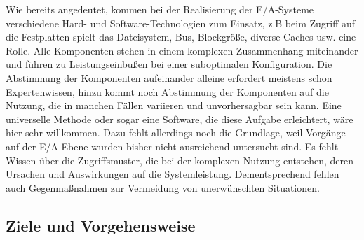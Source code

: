 Wie bereits angedeutet, kommen bei der Realisierung der E/A-Systeme verschiedene Hard- und Software-Technologien zum Einsatz, z.B beim Zugriff auf die Festplatten spielt das Dateisystem, Bus, Blockgröße, diverse Caches usw. eine Rolle. Alle Komponenten stehen in einem komplexen Zusammenhang miteinander und führen zu Leistungseinbußen bei einer suboptimalen Konfiguration. Die Abstimmung der Komponenten aufeinander alleine erfordert meistens schon Expertenwissen, hinzu kommt noch Abstimmung der Komponenten auf die Nutzung, die in manchen Fällen variieren und unvorhersagbar sein kann. Eine universelle Methode oder sogar eine Software, die diese Aufgabe erleichtert, wäre hier sehr willkommen. Dazu fehlt allerdings noch die Grundlage, weil Vorgänge auf der E/A-Ebene wurden bisher nicht ausreichend untersucht sind. Es fehlt Wissen über die Zugriffsmuster, die bei der komplexen Nutzung entstehen, deren Ursachen und Auswirkungen auf die Systemleistung. Dementsprechend fehlen auch 
Gegenmaßnahmen zur Vermeidung von unerwünschten Situationen.

\subsection{Ziele und Vorgehensweise}





